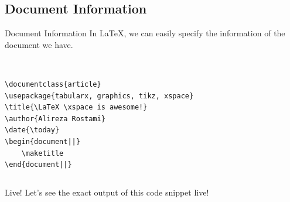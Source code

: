 \documentclass[10pt,xcolor={dvipsnames}, aspectratio=169]{beamer}
\begin{document}
\subsection{Document Information}
\begin{frame}[fragile]{Document Information}
    In \LaTeX, we can easily specify the information of the document we have.
    \smallskip
    \begin{columns}
        \begin{column}{0.9 \textwidth}
        \begin{verbatim}
        
\documentclass{article}
\usepackage{tabularx, graphics, tikz, xspace}
\title{\LaTeX \xspace is awesome!}
\author{Alireza Rostami}
\date{\today}
\begin{document||}
    \maketitle
\end{document||}    

        \end{verbatim}
		\end{column}
    \end{columns}
    \bigskip
    \begin{center}
    \begin{columns}
        \begin{column}{0.5 \textwidth}
        \begin{block}{Live!}
            Let's see the exact output of this code snippet \textcolor{latexBird}{live}!
		\end{block}
		\end{column}
    \end{columns}
    \end{center}
\end{frame}
\end{document}
